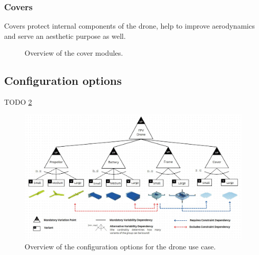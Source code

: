 \documentclass[sigconf,review]{acmart}
\begin{document}
\subsubsection{Covers}
\label{sec:covers}

Covers protect internal components of the drone, help to improve aerodynamics and serve an aesthetic purpose as well.

\begin{figure}[htbp]
    
    \hfill
    \caption{Overview of the cover modules.}
    \label{fig:atomic-modules}
\end{figure}

\subsection{Configuration options}
\label{sec:configuration-options}

TODO \cref{fig:feature-tree}

\begin{figure}[htbp]
    \includegraphics[width=\textwidth]{./FeatureTreeWithLegend3.jpg}
    \caption{Overview of the configuration options for the drone use case.}
    \label{fig:feature-tree}
\end{figure}
\end{document}
